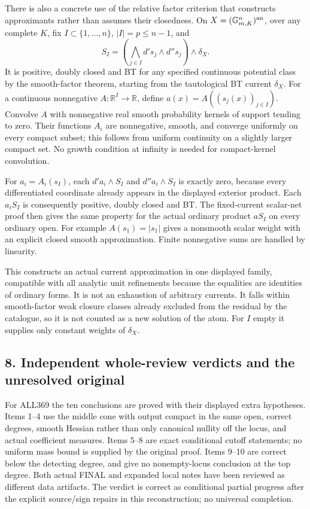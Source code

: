 \documentclass[11pt]{article}
\begin{document}
There is also a concrete use of the relative factor criterion that constructs approximants rather than assumes their closedness. On \(X=(\mathbb G_{m,K}^n)^{\rm an}\), over any complete \(K\), fix \(I\subset\{1,\ldots,n\}\), \(|I|=p\leq n-1\), and
\[
 S_I=\left(\bigwedge_{j\in I}d's_j\wedge d''s_j\right)\wedge\delta_X.
\]
It is positive, doubly closed and BT for any specified continuous potential class by the smooth-factor theorem, starting from the tautological BT current \(\delta_X\). For a continuous nonnegative \(A:\mathbb R^I\to\mathbb R\), define \(a(x)=A((s_j(x))_{j\in I})\). Convolve \(A\) with nonnegative real smooth probability kernels of support tending to zero. Their functions \(A_i\) are nonnegative, smooth, and converge uniformly on every compact subset; this follows from uniform continuity on a slightly larger compact set. No growth condition at infinity is needed for compact-kernel convolution.

For \(a_i=A_i(s_I)\), each \(d'a_i\wedge S_I\) and \(d''a_i\wedge S_I\) is exactly zero, because every differentiated coordinate already appears in the displayed exterior product. Each \(a_iS_I\) is consequently positive, doubly closed and BT. The fixed-current scalar-net proof then gives the same property for the actual ordinary product \(aS_I\) on every ordinary open. For example \(A(s_1)=|s_1|\) gives a nonsmooth scalar weight with an explicit closed smooth approximation. Finite nonnegative sums are handled by linearity.

This constructs an actual current approximation in one displayed family, compatible with all analytic unit refinements because the equalities are identities of ordinary forms. It is not an exhaustion of arbitrary currents. It falls within smooth-factor weak closure classes already excluded from the residual by the catalogue, so it is not counted as a new solution of the atom. For \(I\) empty it supplies only constant weights of \(\delta_X\).

\subsection{8. Independent whole-review verdicts and the unresolved original}

For ALL369 the ten conclusions are proved with their displayed extra hypotheses. Items 1--4 use the middle cone with output compact in the same open, correct degrees, smooth Hessian rather than only canonical nullity off the locus, and actual coefficient measures. Items 5--8 are exact conditional cutoff statements; no uniform mass bound is supplied by the original proof. Items 9--10 are correct below the detecting degree, and give no nonempty-locus conclusion at the top degree. Both actual FINAL and expanded local notes have been reviewed as different data artifacts. The verdict is correct as conditional partial progress after the explicit source/sign repairs in this reconstruction; no universal completion.
\end{document}
